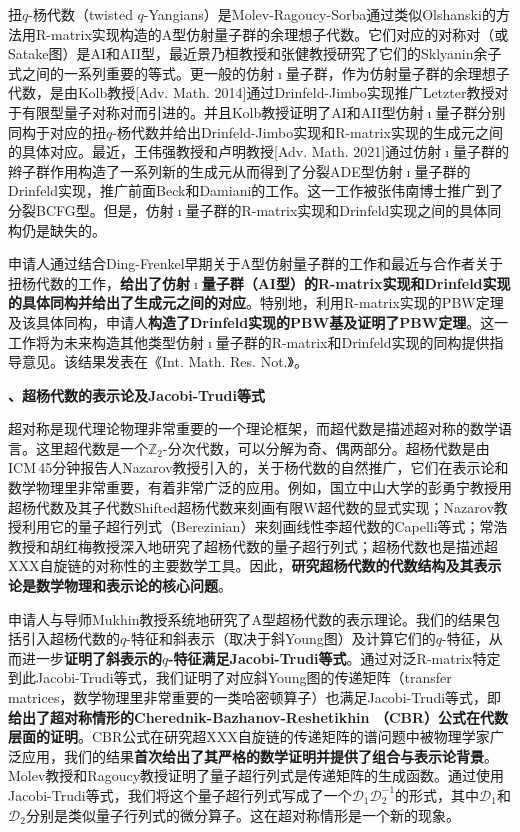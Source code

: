 \documentclass[12pt,UTF8,AutoFakeBold=4,a4paper]{ctexart}
\begin{document}
扭$q$-杨代数（twisted $q$-Yangians）是Molev-Ragoucy-Sorba通过类似Olshanski的方法用R-matrix实现构造的A型仿射量子群的余理想子代数。它们对应的对称对（或Satake图）是AI和AII型，最近景乃桓教授和张健教授研究了它们的Sklyanin余子式之间的一系列重要的等式。更一般的仿射$\imath$量子群，作为仿射量子群的余理想子代数，是由Kolb教授[Adv. Math. 2014]通过Drinfeld-Jimbo实现推广Letzter教授对于有限型量子对称对而引进的。并且Kolb教授证明了AI和AII型仿射$\imath$量子群分别同构于对应的扭$q$-杨代数并给出Drinfeld-Jimbo实现和R-matrix实现的生成元之间的具体对应。最近，王伟强教授和卢明教授[Adv. Math. 2021]通过仿射$\imath$量子群的辫子群作用构造了一系列新的生成元从而得到了分裂ADE型仿射$\imath$量子群的Drinfeld实现，推广前面Beck和Damiani的工作。这一工作被张伟南博士推广到了分裂BCFG型。但是，仿射$\imath$量子群的R-matrix实现和Drinfeld实现之间的具体同构仍是缺失的。

申请人通过结合Ding-Frenkel早期关于A型仿射量子群的工作和最近与合作者关于扭杨代数的工作，\textbf{给出了仿射$\imath$量子群（AI型）的R-matrix实现和Drinfeld实现的具体同构并给出了生成元之间的对应}。特别地，利用R-matrix实现的PBW定理及该具体同构，申请人\textbf{构造了Drinfeld实现的PBW基及证明了PBW定理}。这一工作将为未来构造其他类型仿射$\imath$量子群的R-matrix和Drinfeld实现的同构提供指导意见。该结果发表在《Int. Math. Res. Not.》。

\medskip

\textbf{、超杨代数的表示论及Jacobi-Trudi等式}

超对称是现代理论物理非常重要的一个理论框架，而超代数是描述超对称的数学语言。这里超代数是一个$\mathbb Z_2$-分次代数，可以分解为奇、偶两部分。超杨代数是由ICM\,45分钟报告人Nazarov教授引入的，关于杨代数的自然推广，它们在表示论和数学物理里非常重要，有着非常广泛的应用。例如，国立中山大学的彭勇宁教授用超杨代数及其子代数Shifted超杨代数来刻画有限W超代数的显式实现；Nazarov教授利用它的量子超行列式（Berezinian）来刻画线性李超代数的Capelli等式；常浩教授和胡红梅教授深入地研究了超杨代数的量子超行列式；超杨代数也是描述超XXX自旋链的对称性的主要数学工具。因此，\textbf{研究超杨代数的代数结构及其表示论是数学物理和表示论的核心问题}。

申请人与导师Mukhin教授系统地研究了A型超杨代数的表示理论。我们的结果包括引入超杨代数的$q$-特征和斜表示（取决于斜Young图）及计算它们的$q$-特征，从而进一步\textbf{证明了斜表示的$q$-特征满足Jacobi-Trudi等式}。通过对泛R-matrix特定到此Jacobi-Trudi等式，我们证明了对应斜Young图的传递矩阵（transfer matrices，数学物理里非常重要的一类哈密顿算子）也满足Jacobi-Trudi等式，即\textbf{给出了超对称情形的Cherednik-Bazhanov-Reshetikhin （CBR）公式在代数层面的证明}。CBR公式在研究超XXX自旋链的传递矩阵的谱问题中被物理学家广泛应用，我们的结果\textbf{首次给出了其严格的数学证明并提供了组合与表示论背景}。Molev教授和Ragoucy教授证明了量子超行列式是传递矩阵的生成函数。通过使用Jacobi-Trudi等式，我们将这个量子超行列式写成了一个$\mathcal D_1\mathcal D_2^{-1}$的形式，其中$\mathcal D_1$和$\mathcal D_2$分别是类似量子行列式的微分算子。这在超对称情形是一个新的现象。
\end{document}
